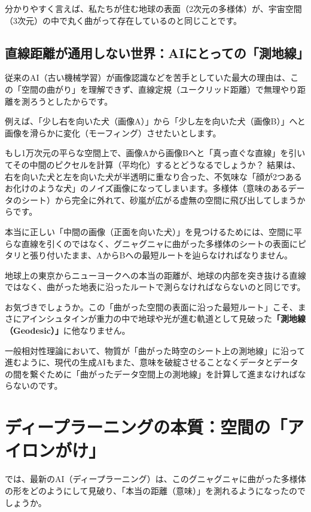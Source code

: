 分かりやすく言えば、私たちが住む地球の表面（2次元の多様体）が、宇宙空間（3次元）の中で丸く曲がって存在しているのと同じことです。

\subsection{直線距離が通用しない世界：AIにとっての「測地線」}

従来のAI（古い機械学習）が画像認識などを苦手としていた最大の理由は、この「空間の曲がり」を理解できず、直線定規（ユークリッド距離）で無理やり距離を測ろうとしたからです。

例えば、「少し右を向いた犬（画像A）」から「少し左を向いた犬（画像B）」へと画像を滑らかに変化（モーフィング）させたいとします。

もし1万次元の平らな空間上で、画像Aから画像Bへと「真っ直ぐな直線」を引いてその中間のピクセルを計算（平均化）するとどうなるでしょうか？ 結果は、右を向いた犬と左を向いた犬が半透明に重なり合った、不気味な「顔が2つあるお化けのような犬」のノイズ画像になってしまいます。多様体（意味のあるデータのシート）から完全に外れて、砂嵐が広がる虚無の空間に飛び出してしまうからです。

本当に正しい「中間の画像（正面を向いた犬）」を見つけるためには、空間に平らな直線を引くのではなく、グニャグニャに曲がった多様体のシートの表面にピタリと張り付いたまま、AからBへの最短ルートを辿らなければなりません。

地球上の東京からニューヨークへの本当の距離が、地球の内部を突き抜ける直線ではなく、曲がった地表に沿ったルートで測らなければならないのと同じです。

お気づきでしょうか。この「曲がった空間の表面に沿った最短ルート」こそ、まさにアインシュタインが重力の中で地球や光が進む軌道として見破った\textbf{「測地線（Geodesic）」}に他なりません。

一般相対性理論において、物質が「曲がった時空のシート上の測地線」に沿って進むように、現代の生成AIもまた、意味を破綻させることなくデータとデータの間を繋ぐために「曲がったデータ空間上の測地線」を計算して進まなければならないのです。

\section{ディープラーニングの本質：空間の「アイロンがけ」}

では、最新のAI（ディープラーニング）は、このグニャグニャに曲がった多様体の形をどのようにして見破り、「本当の距離（意味）」を測れるようになったのでしょうか。

